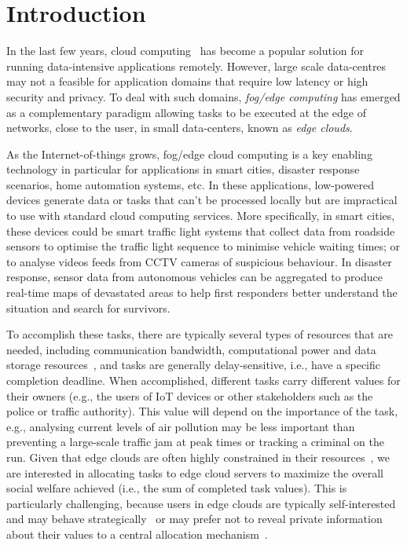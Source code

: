\section{Introduction}
\label{sec:introduction}
In the last few years, cloud computing~\cite{cloud_cite} has become a popular solution for running data-intensive
applications remotely. However, large scale data-centres may not a feasible for application domains that require low
latency or high security and privacy. To deal with such domains, \emph{fog/edge computing} has emerged as a
complementary paradigm allowing tasks to be executed at the edge of networks, close to the user, in small data-centers,
known as \emph{edge clouds}.

As the Internet-of-things grows, fog/edge cloud computing is a key enabling technology in particular for applications
in smart cities, disaster response scenarios, home automation systems, etc. In these applications, low-powered devices
generate data or tasks that can't be processed locally but are impractical to use with standard cloud computing
services. More specifically, in smart cities, these devices could be smart traffic light systems that collect data from
roadside sensors to optimise the traffic light sequence to minimise vehicle waiting times; or to analyse videos feeds
from CCTV cameras of suspicious behaviour. In disaster response, sensor data from autonomous vehicles can be aggregated
to produce real-time maps of devastated areas to help first responders better understand the situation and search for
survivors.

To accomplish these tasks, there are typically several types of resources that are needed, including communication
bandwidth, computational power and data storage resources~\cite{vaji_infocom}, and tasks are generally
delay-sensitive, i.e., have a specific completion deadline. When accomplished, different tasks carry different values
for their owners (e.g., the users of IoT devices or other stakeholders such as the police or traffic authority). This
value will depend on the importance of the task, e.g., analysing current levels of air pollution may be less important
than preventing a large-scale traffic jam at peak times or tracking a criminal on the run. Given that edge clouds are
often highly constrained in their resources~\cite{edge_limitations}, we are interested in allocating tasks to edge
cloud servers to maximize the overall social welfare achieved (i.e., the sum of completed task values). This is
particularly challenging, because users in edge clouds are typically self-interested and may behave
strategically~\cite{Bi2019} or may prefer not to reveal private information about their values to a central allocation
mechanism~\cite{Pai2013}.

